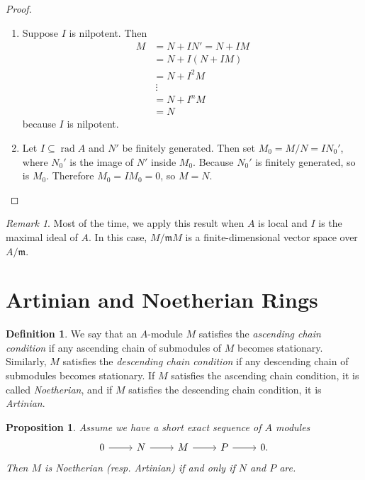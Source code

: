 \documentclass[leqno, openany]{memoir}
\newtheorem{prop}[thm]{Proposition}
\theoremstyle{definition}
\newtheorem{defn}[thm]{Definition}
\theoremstyle{remark}
\newtheorem{rmk}[thm]{Remark}
\theoremstyle{plain}
\theoremstyle{definition}
\theoremstyle{remark}
\newcommand{\mf}[1]{\mathfrak{#1}}
\begin{document}
\begin{proof}
    \begin{enumerate}
        \item Suppose $I$ is nilpotent. Then
            \begin{align*}
                M &= N + IN' = N+IM \\
                  &= N + I (N + IM) \\
                  &= N + I^2 M \\
                  &\ \vdots \\
                  &= N + I^n M \\
                  &= N
            \end{align*}
            because $I$ is nilpotent.
        \item Let $I \subseteq \operatorname{rad} A$ and $N'$ be finitely generated. Then set $M_0 = M/N = I N_0'$, where $N_0'$ is the image of $N'$ inside $M_0$. Because $N_0'$ is finitely generated, so is $M_0$. Therefore $M_0 = I M_0 = 0$, so $M = N$.
    \end{enumerate}
\end{proof}

\begin{rmk}
    Most of the time, we apply this result when $A$ is local and $I$ is the maximal ideal of $A$. In this case, $M / \mf{m} M$ is a finite-dimensional vector space over $A / \mf{m}$.
\end{rmk}

\section{Artinian and Noetherian Rings}%
\label{sec:artinian_and_noetherian_rings}

\begin{defn}
    We say that an $A$-module $M$ satisfies the \textit{ascending chain condition} if any ascending chain of submodules of $M$ becomes stationary. Similarly, $M$ satisfies the \textit{descending chain condition} if any descending chain of submodules becomes stationary. If $M$ satisfies the ascending chain condition, it is called \textit{Noetherian}, and if $M$ satisfies the descending chain condition, it is \textit{Artinian}.
\end{defn}

\begin{prop}
    Assume we have a short exact sequence of $A$ modules
    \begin{equation}
    \begin{tikzcd}
        0 \arrow{r} & N \arrow{r} & M \arrow{r} & P \arrow{r} & 0.
    \end{tikzcd}
    \end{equation}
    Then $M$ is Noetherian (resp. Artinian) if and only if $N$ and $P$ are.
\end{prop}
\end{document}
